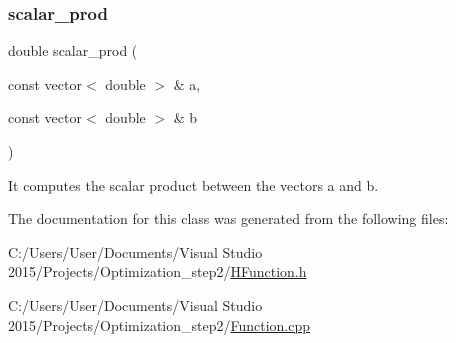 \subsubsection{\texorpdfstring{scalar\+\_\+prod}{scalar\_prod}}
{\footnotesize\ttfamily double scalar\+\_\+prod (\begin{DoxyParamCaption}\item[{const vector$<$ double $>$ \&}]{a,  }\item[{const vector$<$ double $>$ \&}]{b }\end{DoxyParamCaption})\hspace{0.3cm}{\ttfamily [friend]}}



It computes the scalar product between the vectors a and b. 



The documentation for this class was generated from the following files\+:\begin{DoxyCompactItemize}
\item 
C\+:/\+Users/\+User/\+Documents/\+Visual Studio 2015/\+Projects/\+Optimization\+\_\+step2/\hyperlink{_h_function_8h}{H\+Function.\+h}\item 
C\+:/\+Users/\+User/\+Documents/\+Visual Studio 2015/\+Projects/\+Optimization\+\_\+step2/\hyperlink{_function_8cpp}{Function.\+cpp}\end{DoxyCompactItemize}
